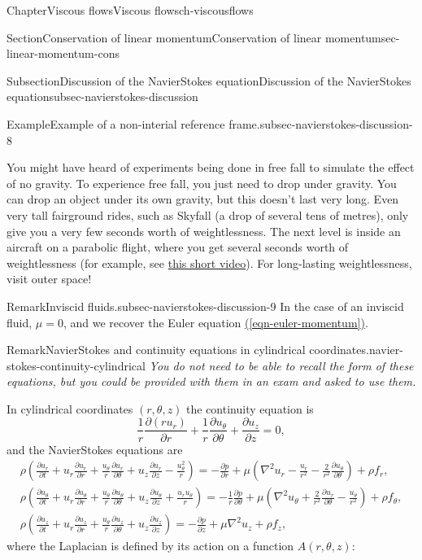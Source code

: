 \documentclass[oneside,10pt,]{book}
\newcommand{\xreffont}{\relax}
\numberwithin{equation}{section}
\newcommand{\pd}[2]{\frac{\partial#1}{\partial#2}}
\begin{document}
\begin{chapterptx}{Chapter}{Viscous flows}{}{Viscous flows}{}{}{ch-viscousflows}
\begin{sectionptx}{Section}{Conservation of linear momentum}{}{Conservation of linear momentum}{}{}{sec-linear-momentum-cons}
\begin{subsectionptx}{Subsection}{Discussion of the Navier\textendash{}Stokes equation}{}{Discussion of the Navier\textendash{}Stokes equation}{}{}{subsec-navierstokes-discussion}
\begin{example}{Example}{Example of a non-interial reference frame.}{subsec-navierstokes-discussion-8}
\par
You might have heard of experiments being done in free fall to simulate the effect of no gravity. To experience free fall, you just need to drop under gravity. You can drop an object under its own gravity, but this doesn't last very long. Even very tall fairground rides, such as Skyfall (a drop of several tens of metres), only give you a very few seconds worth of weightlessness. The next level is inside an aircraft on a parabolic flight, where you get several seconds worth of weightlessness (for example, see \href{https://www.youtube.com/shorts/zVgJjdupZ5o}{this short video}). For long-lasting weightlessness, visit outer space!%
\end{example}
\begin{remark}{Remark}{Inviscid fluids.}{subsec-navierstokes-discussion-9}%
In the case of an inviscid fluid, \(\mu=0\), and we recover the Euler equation \hyperref[eqn-euler-momentum]{({\xreffont\ref{eqn-euler-momentum}})}.%
\end{remark}
\begin{remark}{Remark}{Navier\textendash{}Stokes and continuity equations in cylindrical coordinates.}{navier-stokes-continuity-cylindrical}%
\emph{You do not need to be able to recall the form of these equations, but you could be provided with them in an exam and asked to use them.}%
\par
In cylindrical coordinates \((r,\theta,z)\) the continuity equation is%
\begin{equation*}
\frac1r\pd{(ru_r)}{r}+\frac1r\pd{u_\theta}{\theta}+\pd{u_z}{z}=0,
\end{equation*}
and the Navier\textendash{}Stokes equations are%
\begin{gather*}
\rho\left(\pd{u_r}{t}+u_r\pd{u_r}{r}+\frac{u_{\theta}}{r}\pd{u_r}{\theta}+u_z\pd{u_r}{z}-\frac{u_{\theta}^2}{r}\right)
=-\pd{p}{r}
+\mu\left(\nabla^2u_r-\frac{u_r}{r^2}-\frac{2}{r^2}\pd{u_\theta}{\theta}\right)+\rho f_r,\\
\rho\left(\pd{u_{\theta}}{t}+u_r\pd{u_{\theta}}{r}+\frac{u_{\theta}}{r}\pd{u_{\theta}}{\theta}+u_z\pd{u_{\theta}}{z}+\frac{u_ru_{\theta}}{r}\right)
=-\frac{1}{r}\pd{p}{\theta}
+\mu\left(\nabla^2u_\theta+\frac{2}{r^2}\pd{u_r}{\theta}-\frac{u_{\theta}}{r^2}\right)+\rho f_{\theta},\\
\rho\left(\pd{u_z}{t}+u_r\pd{u_z}{r}+\frac{u_{\theta}}{r}\pd{u_z}{\theta}+u_z\pd{u_z}{z}\right)
=-\pd{p}{z}
+\mu\nabla^2u_z+\rho f_z,
\end{gather*}
where the Laplacian is defined by its action on a function \(A(r,\theta,z)\):%

\end{remark}
\end{subsectionptx}
\end{sectionptx}
\end{chapterptx}
\end{document}
